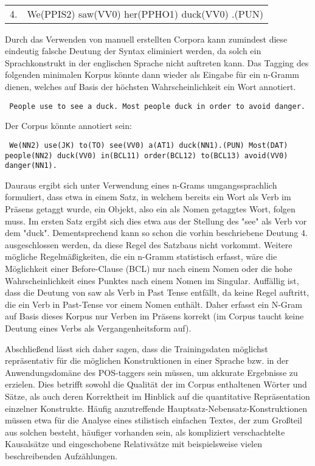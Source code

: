 \documentclass[12pt]{paper}
\begin{document}
\tt
\begin{tabular}{ll} 
4. & We(PPIS2) saw(VV0) her(PPHO1) duck(VV0) .(PUN)\\
\end{tabular} \rm

Durch das Verwenden von manuell erstellten Corpora kann zumindest diese eindeutig falsche Deutung der Syntax eliminiert werden, da solch ein Sprachkonstrukt in der englischen Sprache nicht auftreten kann. Das Tagging des folgenden minimalen Korpus könnte dann wieder als Eingabe für ein n-Gramm dienen, welches auf Basis der höchsten Wahrscheinlichkeit ein Wort annotiert.

\tt
People use to see a duck. Most people duck in order to avoid danger.
\rm

Der Corpus könnte annotiert sein:

\tt
We(NN2) use(JK) to(TO) see(VV0) a(AT1) duck(NN1).(PUN) Most(DAT) people(NN2) duck(VV0) in(BCL11) order(BCL12) to(BCL13) avoid(VV0) danger(NN1).
\rm

Dauraus ergibt sich unter Verwendung eines n-Grams umgangssprachlich formuliert, dass etwa in einem Satz, in welchem bereits ein Wort als Verb im Präsens getaggt wurde, ein Objekt, also ein als Nomen getaggtes Wort, folgen muss. Im ersten Satz ergibt sich dies etwa aus der Stellung des "see" als Verb vor dem "duck". Dementsprechend kann so schon die vorhin beschriebene Deutung 4. ausgeschlossen werden, da diese Regel des Satzbaus nicht vorkommt. Weitere mögliche Regelmäßigkeiten, die ein n-Gramm statistisch erfasst, wäre die Möglichkeit einer Before-Clause (BCL) nur nach einem Nomen oder die hohe Wahrscheinlichkeit eines Punktes nach einem Nomen im Singular. Auffällig ist, dass die Deutung von saw als Verb in Past Tense entfällt, da keine Regel auftritt, die ein Verb in Past-Tense vor einem Nomen enthält. Daher erfasst ein N-Gram auf Basis dieses Korpus nur Verben im Präsens korrekt (im Corpus taucht keine Deutung eines Verbs als Vergangenheitsform auf). 

Abschließend lässt sich daher sagen, dass die Trainingsdaten möglichst repräsentativ für die möglichen Konstruktionen in einer Sprache bzw. in der Anwendungsdomäne des POS-taggers sein müssen, um akkurate Ergebnisse zu erzielen. Dies betrifft sowohl die Qualität der im Corpus enthaltenen Wörter und Sätze, als auch deren Korrektheit im Hinblick auf die quantitative Repräsentation einzelner Konstrukte. Häufig anzutreffende Hauptsatz-Nebensatz-Konstruktionen müssen etwa für die Analyse eines stilistisch einfachen Textes, der zum Großteil aus solchen besteht, häufiger vorhanden sein, als kompliziert verschachtelte Kausalsätze und eingeschobene Relativsätze mit beispielsweise vielen beschreibenden Aufzählungen.  
\end{document}

